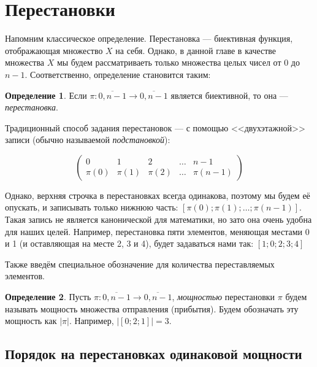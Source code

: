 \documentclass[12pt,a4paper,oneside]{article}
\begin{document}
\theoremstyle{definition}
\newtheorem{definition}{Определение}[section]

\theoremstyle{lemma}
\newtheorem{lemma}{Лемма}[section]

\section{Перестановки}

Напомним классическое определение. Перестановка --- биективная функция, отображающая 
множество $X$ на себя.
Однако, в данной главе в качестве множества $X$ мы будем рассматриваеть только 
множества целых чисел от $0$ до $n-1$. Соответственно, определение становится таким:

\begin{definition}
Если $\pi: \overline{0,n-1} \rightarrow \overline{0,n-1}$ является биективной,
то она --- \emph{перестановка}.
\end{definition}

Традиционный способ задания перестановок --- с помощью <<двухэтажной>> записи 
(обычно называемой \emph{подстановкой}):

$$
\left(\begin{array}{ccccc}
0 & 1 & 2 & \dots & n-1\\
\pi(0) & \pi(1) & \pi(2) & \dots & \pi(n-1)
\end{array}\right)
$$

Однако, верхняя строчка в перестановках всегда одинакова, поэтому мы будем её опускать,
и записывать только нижнюю часть: $[\pi(0);\pi(1);\dots;\pi(n-1)]$. Такая запись не является
канонической для математики, но зато она очень удобна для наших целей.
Например, перестановка пяти элементов, меняющая местами 0 и 1 (и оставляющая на месте 2, 3 и 4), 
будет задаваться нами так: $[1;0;2;3;4]$

Также введём специальное обозначение для количества переставляемых элементов.

\begin{definition}
Пусть $\pi: \overline{0,n-1} \rightarrow \overline{0,n-1}$, \emph{мощностью}
перестановки $\pi$ будем называть мощность множества отправления (прибытия).
Будем обозначать эту мощность как $|\pi|$.
Например, $|[0;2;1]| = 3$. 
\end{definition}

\subsection{Порядок на перестановках одинаковой мощности}
\end{document}
